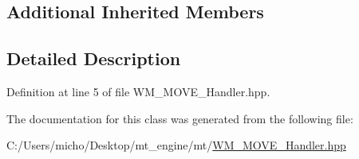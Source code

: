 \subsection*{Additional Inherited Members}


\subsection{Detailed Description}


Definition at line 5 of file W\+M\+\_\+\+M\+O\+V\+E\+\_\+\+Handler.\+hpp.



The documentation for this class was generated from the following file\+:\begin{DoxyCompactItemize}
\item 
C\+:/\+Users/micho/\+Desktop/mt\+\_\+engine/mt/\hyperlink{_w_m___m_o_v_e___handler_8hpp}{W\+M\+\_\+\+M\+O\+V\+E\+\_\+\+Handler.\+hpp}\end{DoxyCompactItemize}
